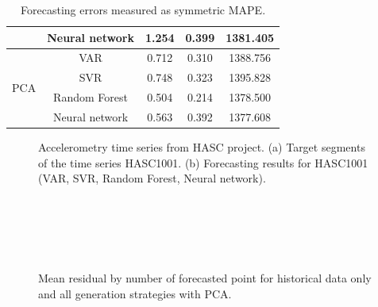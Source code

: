 \documentclass[conference]{IEEEtran}
\begin{document}
\begin{table}
\begin{tabular}{|c|c|c|c|c|}
\cline{2-5}
 &Neural network &   1.254 &    0.399 &    1381.405\\
\cline{2-5}
\hline
\multirow{4}{*}{PCA} &VAR &   0.712 &    0.310 &    1388.756\\
\cline{2-5}
 &SVR &   0.748 &    0.323 &    1395.828\\
\cline{2-5}
 &Random Forest &   0.504 &    0.214 &    1378.500\\
\cline{2-5}
 &Neural network &   0.563 &    0.392 &    1377.608\\
\cline{2-5}
\hline
\end{tabular}
\caption{Forecasting errors measured as symmetric MAPE.}
\label{fg:feature_selection_res_HASC1}
\end{table}


\begin{figure}
\centering
\caption{Accelerometry time series from HASC project.
(a) Target segments of the time series HASC1001. (b) Forecasting results for	HASC1001 (VAR, SVR, Random Forest, Neural network).}\label{fg:target_data}
\end{figure}


\begin{figure}
\centering
{}
 \\
\\
 \\
\\
\caption{Mean residual by number of forecasted point for historical data only and all generation strategies with PCA.}
\end{figure}
\end{document}
